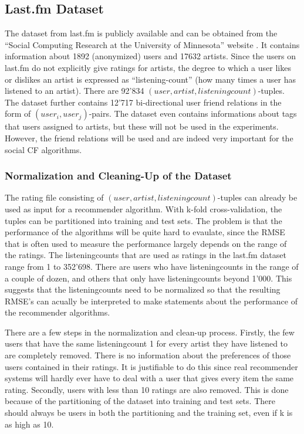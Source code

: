 \subsection{Last.fm Dataset}
\label{sst:lastfmdataset} The dataset from last.fm is publicly available and can be obtained from the ``Social Computing Research at the University of Minnesota'' website \cite{Grouplens}. It contains information about 1892 (anonymized) users and 17632 artists. Since the users on last.fm do not explicitly give ratings for artists, the degree to which a user likes or dislikes an artist is expressed as ``listening-count'' (how many times a user has listened to an artist). There are 92'834 $(user, artist, listeningcount)$-tuples. The dataset further contains 12'717 bi-directional user friend relations in the form of $(user_i, user_j)$-pairs. The dataset even contains informations about tags that users assigned to artists, but these will not be used in the experiments. However, the friend relations will be used and are indeed very important for the social CF algorithms.

\subsubsection{Normalization and Cleaning-Up of the Dataset}
\label{sst:normalizationandcleaningup} The rating file consisting of $(user, artist, listeningcount)$-tuples can already be used as input for a recommender algorithm. With k-fold cross-validation, the tuples can be partitioned into training and test sets. The problem is that the performance of the algorithms will be quite hard to evaulate, since the RMSE that is often used to measure the performance largely depends on the range of the ratings. The listeningcounts that are used as ratings in the last.fm dataset range from 1 to 352'698. There are users who have listeningcounts in the range of a couple of dozen, and others that only have listeningcounts beyond 1'000. This suggests that the listeningcounts need to be normalized so that the resulting RMSE's can acually be interpreted to make statements about the performance of the recommender algorithms.

There are a few steps in the normalization and clean-up process. Firstly, the few users that have the same listeningcount 1 for every artist they have listened to are completely removed. There is no information about the preferences of those users contained in their ratings. It is justifiable to do this since real recommender systems will hardly ever have to deal with a user that gives every item the same rating. Secondly, users with less than 10 ratings are also removed. This is done because of the partitioning of the dataset into training and test sets. There should always be users in both the partitioning and the training set, even if k is as high as 10.

